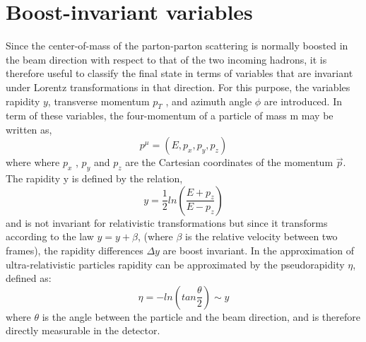 \documentclass[PhD,binding=0.6cm]{../sapthesis}
\begin{document}
\mainmatter


 
 








{}

\appendix

\chapter{Boost-invariant variables}
\label{psr}
Since the center-of-mass of the parton-parton scattering is normally boosted in the beam
direction with respect to that of the two incoming hadrons, it is therefore useful to classify
the final state in terms of variables that are invariant under Lorentz transformations in
that direction. For this purpose, the variables rapidity $y$, transverse momentum $p_T$ , and
azimuth angle $\phi$ are introduced. In term of these variables, the four-momentum of a
particle of mass m may be written as,
\begin{equation}
p^{\mu}=(E,p_x,p_y,p_z)
\end{equation}
where where $p_x$ , $p_y$ and $p_z$ are the Cartesian coordinates of the momentum $\vec{p}$. 
The rapidity y is defined by the relation,
\begin{equation}
y=\frac{1}{2} ln (\frac{E+p_z}{E-p_z})
\end{equation}
and is not invariant for relativistic transformations but since it transforms according to
the law $y = y + \beta$, (where $\beta$ is the relative velocity between two frames), the rapidity
differences $\Delta y$ are boost invariant. In the approximation of ultra-relativistic particles rapidity can be approximated by the pseudorapidity $\eta$, defined as:
\begin{equation}
\eta=- ln (tan \frac{\theta}{2}) \sim y
\end{equation}
where $\theta$ is the angle between the particle and the beam direction, and
is therefore directly measurable in the detector.
\end{document}
